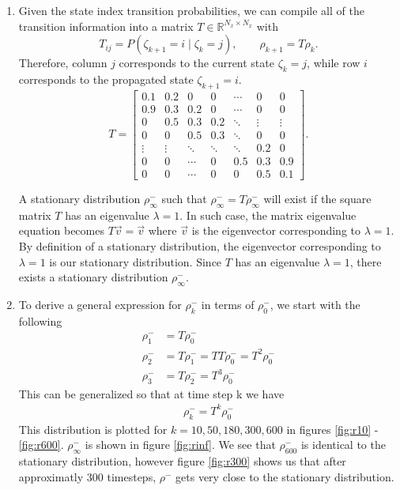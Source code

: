 \documentclass[11pt]{article}
\begin{document}
\begin{enumerate}[label = \alph*)]
    \item 
        Given the state index transition probabilities, we can compile all of the transition information into a matrix $T \in \mathbb{R}^{N_x \times N_x}$ with
        \[
            T_{ij} = P(\zeta_{k+1}=i \mid \zeta_k=j),
            \qquad
            \rho_{k+1} = T \rho_k.
        \]
        Therefore, column $j$ corresponds to the current state $\zeta_k=j$, while row $i$ corresponds to the propagated state $\zeta_{k+1}=i$. 
        \[
        T =
        \begin{bmatrix}
        0.1 & 0.2 & 0   & 0   & \cdots & 0   & 0 \\
        0.9 & 0.3 & 0.2 & 0   & \cdots & 0   & 0 \\
        0   & 0.5 & 0.3 & 0.2 & \ddots & \vdots & \vdots \\
        0   & 0   & 0.5 & 0.3 & \ddots & 0   & 0 \\
        \vdots & \vdots & \ddots & \ddots & \ddots & 0.2 & 0 \\
        0   & 0   & \cdots & 0   & 0.5 & 0.3 & 0.9 \\
        0   & 0   & \cdots & 0   & 0   & 0.5 & 0.1
        \end{bmatrix}.
        \]

        A stationary distribution $\rho^-_\infty$ such that $\rho^-_\infty = T \rho^-_\infty$ will exist if the square matrix $T$ has an eigenvalue $\lambda = 1$. In such case, the matrix eigenvalue equation becomes
        \(T\vec{v} = \vec{v}\) where $\vec{v}$ is the eigenvector corresponding to $\lambda = 1$. By definition of a stationary distribution, the eigenvector corresponding to $\lambda = 1$ is our stationary distribution. 
        Since $T$ has an eigenvalue $\lambda = 1$, there exists a stationary distribution $\rho^-_\infty$.

    \item  
        To derive a general expression for $\rho^-_k$ in terms of $\rho^-_0$, we start with the following
        \begin{align*}
            \rho^-_1 &= T \rho^-_0 \\
            \rho^-_2 &= T \rho^-_1 = T T \rho^-_0 = T^2 \rho^-_0 \\ 
            \rho^-_3 &= T \rho^-_2 = T^3 \rho^-_0
        \end{align*}
        This can be generalized so that at time step k we have 
        \begin{align*}
            \rho^-_k = T^k \rho^-_0
        \end{align*}
        This distribution is plotted for $k = 10,50,180,300,600$ in figures \ref{fig:r10} - \ref{fig:r600}. $\rho^-_\infty$ is shown in figure \ref{fig:rinf}. We see that $\rho^-_{600}$ is identical to the stationary distribution, however figure \ref{fig:r300} 
        shows us that after approximatly 300 timesteps, $\rho^-$ gets very close to the stationary distribution.


\end{enumerate}
\end{document}
